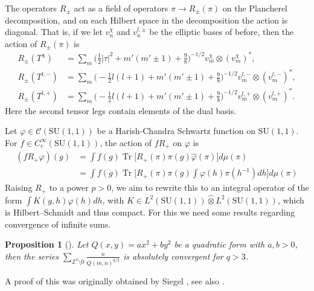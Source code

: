 \documentclass{amsart}
\newtheorem{proposition}[theorem]{Proposition}
\theoremstyle{definition}
\theoremstyle{remark}
\DeclareMathOperator{\Tr}{Tr}
\numberwithin{equation}{section}
\begin{document}
The operators $R_\pm$ act as a field of operators $\pi\rightarrow R_\pm(\pi)$ on the Plancherel decomposition, and on each Hilbert space in the decomposition the action is diagonal. That is, if we let $v_n^\chi$ and $v^{l,\pm}_n$ be the elliptic bases of before, then the action of $R_\pm(\pi)$ is
\begin{equation}\label{eq_action_R}
    \begin{aligned}
        R_\pm(T^\chi)&=\sum_m\Big(\tfrac{1}{2}|\tau|^2+m'(m'\pm1)+\tfrac{9}{8}\Big)^{-1/2} v^\chi_m\otimes (v^\chi_m)^*,\\
        R_\pm(T^{l,-})&=\sum_m \Big(-\tfrac{1}{2}l(l+1)+m'(m'\pm1)+\tfrac{9}{8}\Big)^{-1/2} v_m^{l,-}\otimes (v_m^{l,-})^*,\\
        R_\pm(T^{l,+})&=\sum_m \Big(-\tfrac{1}{2}l(l+1)+m'(m'\pm1)+\tfrac{9}{8}\Big)^{-1/2} v_m^{l,+}\otimes (v_m^{l,+})^*.
    \end{aligned}
\end{equation}
Here the second tensor legs contain elements of the dual basis. 

Let $\varphi\in\mathcal{C}(\mathrm{SU}(1,1))$ be a Harish-Chandra Schwartz function on $\mathrm{SU}(1,1)$. For $f\in C_c^\infty(\mathrm{SU}(1,1))$, the action of $fR_+$ on $\varphi$ is
\begin{equation}
    \begin{aligned}
        (fR_+\varphi)(g)&=\int f(g)\Tr\big[R_+(\pi)\pi(g)\hat{\varphi}(\pi)\big]d\mu(\pi)\\
        &=\int f(g)\Tr\big[R_+(\pi)\pi(g)\int\varphi(h)\pi(h^{-1})dh \big]d\mu(\pi) 
    \end{aligned}
\end{equation}
Raising $R_+$ to a power $p>0$, we aim to rewrite this to an integral operator of the form $\int K(g,h)\varphi(h)dh$, with $K\in L^2(\mathrm{SU}(1,1))\hat{\otimes} L^2(\mathrm{SU}(1,1))$, which is Hilbert--Schmidt and thus compact. For this we need some results regarding convergence of infinite sums.

\begin{proposition}[\cite{siegel_1980}]\label{sum_convergence}
    Let $Q(x,y)=ax^2+by^2$ be a quadratic form with $a,b>0$, then the series $\sum_{\mathbb{Z}^2\setminus 0}\frac{n}{Q(m,n)^{q/2}}$ is absolutely convergent for $q>3$.
\end{proposition}
A proof of this was originally obtained by Siegel \cite{siegel_1980}, see also \cite[Theorem 1.3]{hiroe_oda_2008}.
\end{document}
